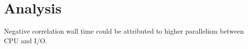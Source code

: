 ﻿\section{Analysis}

Negative correlation wall time could be attributed to higher parallelism between CPU and I/O.
